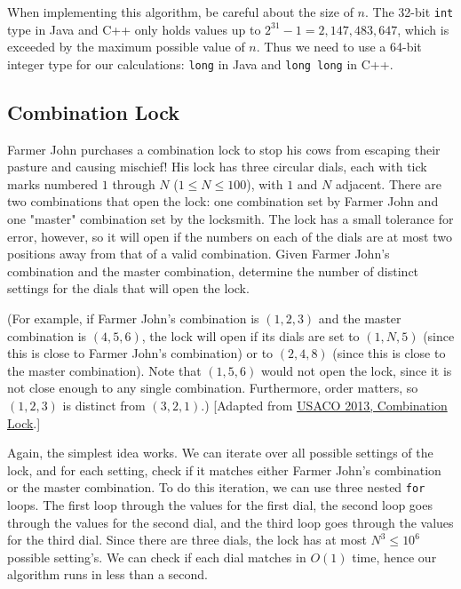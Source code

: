 When implementing this algorithm, be careful about the size of $n$. The 32-bit \texttt{int} type in Java and C++ only holds values up to $2^{31} - 1 = 2,147,483,647$, which is exceeded by the maximum possible value of $n$. Thus we need to use a 64-bit integer type for our calculations: \texttt{long} in Java and \texttt{long long} in C++.

\subsection{Combination Lock}

\begin{typewriter}
  Farmer John purchases a combination lock to stop his cows from escaping their pasture and causing mischief! His lock has three circular dials, each with tick marks numbered $1$ through $N$ ($1\le N\le 100$), with $1$ and $N$ adjacent. There are two combinations that open the lock: one combination set by Farmer John and one "master" combination set by the locksmith. The lock has a small tolerance for error, however, so it will open if the numbers on each of the dials are at most two positions away from that of a valid combination. Given Farmer John's combination and the master combination, determine the number of distinct settings for the dials that will open the lock. 

  (For example, if Farmer John's combination is $(1,2,3)$ and the master combination is $(4,5,6)$, the lock will open if its dials are set to $(1,N,5)$ (since this is close to Farmer John's combination) or to $(2,4,8)$ (since this is close to the master combination). Note that $(1,5,6)$ would not open the lock, since it is not close enough to any single combination. Furthermore, order matters, so $(1,2,3)$ is distinct from $(3,2,1)$.) [Adapted from \href{http://usaco.org/index.php?page=viewproblem2&cpid=340}{USACO 2013, Combination Lock}.]
\end{typewriter}

Again, the simplest idea works. We can iterate over all possible settings of the lock, and for each setting, check if it matches either Farmer John's combination or the master combination. To do this iteration, we can use three nested \texttt{for} loops. The first loop through the values for the first dial, the second loop goes through the values for the second dial, and the third loop goes through the values for the third dial. Since there are three dials, the lock has at most $N^3 \le 10^6$ possible setting's. We can check if each dial matches in $O(1)$ time, hence our algorithm runs in less than a second.

